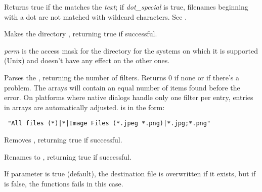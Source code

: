 \label{wxmatchwild}


Returns true if the \/ matches the {\it text}\/; if {\it
dot\_special}\/ is true, filenames beginning with a dot are not matched
with wildcard characters. See .


\label{wxmkdir}


Makes the directory , returning true if successful.

{\it perm} is the access mask for the directory for the systems on which it is
supported (Unix) and doesn't have any effect on the other ones.


\label{wxparsecommondialogsfilter}


Parses the , returning the number of filters.
Returns 0 if none or if there's a problem.
The arrays will contain an equal number of items found before the error.
On platforms where native dialogs handle only one filter per entry,
entries in arrays are automatically adjusted.
 is in the form:
\begin{verbatim}
 "All files (*)|*|Image Files (*.jpeg *.png)|*.jpg;*.png"
\end{verbatim}

\label{wxremovefile}


Removes , returning true if successful.


\label{wxrenamefile}


Renames  to , returning true if successful.

If  parameter is true (default), the destination file is
overwritten if it exists, but if  is false, the functions fails
in this case.


